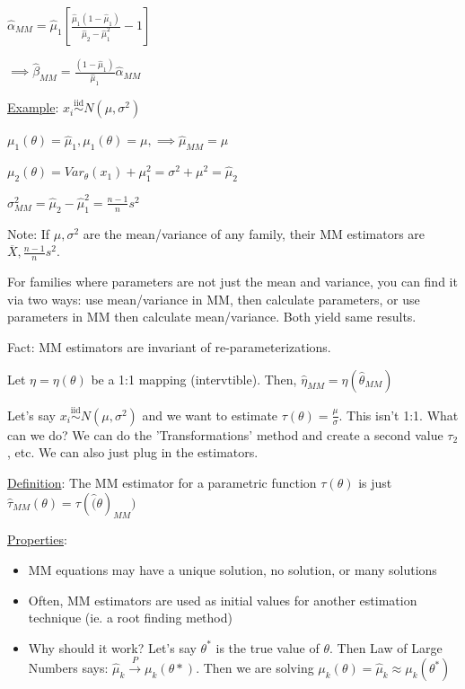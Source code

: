 \documentclass{article}
\newcommand{\pto}{\overset{P}{\to}}
\newcommand{\iiddist}{\overset{\mathrm{iid}}{\sim}}
\begin{document}
$\hat{\alpha}_{MM} = \hat{\mu}_1\left[\frac{\hat{\mu}_1(1-\hat{\mu}_1)}{\hat{\mu}_2 - \hat{\mu}_1^2} - 1 \right]$

$\implies \hat{\beta}_{MM} = \frac{(1-\hat{\mu}_1)}{\hat{\mu}_1}\hat{\alpha}_{MM}$

\underline{Example}: $x_i \iiddist N(\mu, \sigma^2)$

$\mu_1(\theta) = \hat{\mu}_1, \mu_1(\theta) = \mu, \implies \hat{\mu}_{MM} = \mu$

$\mu_2(\theta) = Var_{\theta}(x_1) + \mu_1^2 = \sigma^2 + \mu^2 = \hat{\mu}_2$

$\sigma^2_{MM} = \hat{\mu}_2 - \hat{\mu}_1^2 = \frac{n-1}{n}s^2$

Note: If $\mu, \sigma^2$ are the mean/variance of any family, their MM estimators are $\overline{X}, \frac{n-1}{n}s^2$.

For families where parameters are not just the mean and variance, you can find it via two ways: use mean/variance in MM, then calculate parameters, or use parameters in MM then calculate mean/variance. Both yield same results. 

Fact: MM estimators are invariant of re-parameterizations.

Let $\eta = \eta(\theta)$ be a 1:1 mapping (intervtible). Then, $\hat{\eta}_{MM} = \eta(\hat{\theta}_{MM})$

Let's say $x_i \iiddist N(\mu, \sigma^2)$ and we want to estimate $\tau(\theta) = \frac{\mu}{\sigma}$. This isn't 1:1. What can we do? We can do the 'Transformations' method and create a second value $\tau_2$, etc. We can also just plug in the estimators. 

\underline{Definition}: The MM estimator for a parametric function $\tau(\theta)$ is just $\hat{\tau}_{MM}(\theta) = \tau(\hat(\theta)_{MM})$

\underline{Properties}:
\begin{itemize}
    \item MM equations may have a unique solution, no solution, or many solutions
    \item Often, MM estimators are used as initial values for another estimation technique (ie. a root finding method)
    \item Why should it work? Let's say $\theta^*$ is the true value of $\theta$. Then Law of Large Numbers says: $\hat{\mu}_k \pto \mu_k(\theta*)$. Then we are solving $\mu_k(\theta) = \hat{\mu}_k \approx \mu_k(\theta^*)$
\end{itemize}
\end{document}
